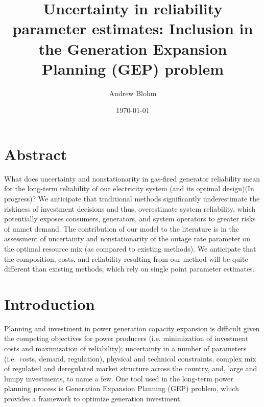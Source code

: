 \documentclass[10pt]{amsart}
\title{Uncertainty in reliability parameter estimates: Inclusion in the Generation Expansion Planning (GEP) problem}
\author{Andrew Blohm}
\date{\today}
\begin{document}
\maketitle

\section{Abstract}
What does uncertainty and nonstationarity in gas-fired generator reliability mean for the long-term reliability of our electricity system (and its optimal design)(In progress)? 
We anticipate that traditional methods significantly underestimate the riskiness of investment decisions and thus, overestimate system reliability, which potentially exposes consumers, generators, and system operators to greater risks of unmet demand. 
The contribution of our model to the literature is in the assessment of uncertainty and nonstationarity of the outage rate parameter on the optimal resource mix (as compared to existing methods). 
We anticipate that the composition, costs, and reliability resulting from our method will be quite different than existing methods, which rely on single point parameter estimates. 

\section{Introduction}
Planning and investment in power generation capacity expansion is difficult given the competing objectives for power producers (i.e. minimization of investment costs and maximization of reliability); uncertainty in a number of parameters (i.e.\ costs, demand, regulation), physical and technical constraints, complex mix of regulated and deregulated market structure across the country, and, large and lumpy investments, to name a few. 
One tool used in the long-term power planning process is Generation Expansion Planning (GEP) problem, which provides a framework to optimize generation investment.
	
\end{document}
